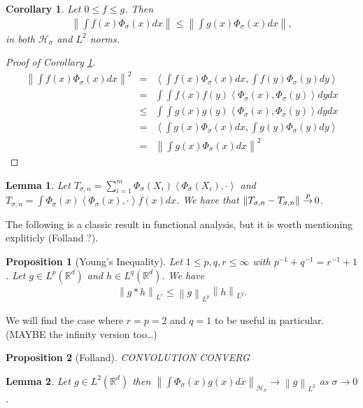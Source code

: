 \documentclass{article} %
\def\hsig{{\mathcal{H}_\sigma}}
\def\fm{{\Phi_\sigma}} %
\def\cip{\,{\buildrel p \over \rightarrow}\,}
\def\rn{\mathbb{R}}
\def\l{\left}
\def\r{\right}
\newtheorem{lem}{Lemma}
\newtheorem{cor}{Corollary}
\newtheorem{prop}{Proposition}
\theoremstyle{definition}
\begin{document}
\begin{cor}\label{cor:hilbbigger}
	Let $0\le f\le g$. Then
	\begin{eqnarray*}
		\l\|\int f(x) \fm(x) dx\r\| \le \l\|\int g(x) \fm(x)dx\r\|,
	\end{eqnarray*}
	in both $\hsig$ and $L^2$ norms.
\end{cor}
\begin{proof}[Proof of Corollary \ref{cor:hilbbigger}]
	\begin{eqnarray*}
		\l\|\int f(x) \fm(x) dx\r\|^2
		&=& \l<\int f(x) \fm\left( x \right) dx , \int f(y) \fm \left( y \right) dy \r>\\
		       &=& \int \int f(x) f(y)\l< \fm\left( x \right)  ,  \fm \left( y \right)  \r>dydx\\
			      &\le& \int \int g(x) g(y)\l< \fm\left( x \right)  ,  \fm \left( y \right)  \r>dydx\\
			      &=& \l<\int g(x) \fm\left( x \right) dx , \int g(y) \fm \left( y \right) dy \r>\\
			      &=& \l\|\int g(x) \fm(x) dx\r\|^2
	\end{eqnarray*}
\end{proof}
\begin{lem}
	Let $T_{\sigma,n} = \sum_{i=1}^m \fm\left( X_i \right)\l<\fm\left( X_i \right),\cdot\r>$ and $T_{\sigma,n} = \int \fm(x)\l<\fm(x),\cdot\r> f(x) dx$. We have that $\l\|T_{\sigma,n} - T_{\sigma,n}\r\| \cip 0$.
\end{lem}


The following is a classic result in functional analysis, but it is worth mentioning expliticly (Folland ?).
\begin{prop}[Young's Inequality]\label{prop:young}
	Let $1\le p,q,r \le \infty$ with $p^{-1} + q^{-1} = r^{-1} +1$. Let $g \in L^p\left( \rn^d \right)$ and $h \in L^q\left( \rn^d \right)$. We have
	\begin{eqnarray*}
		\l\|g\ast h \r\|_{L^r} \le \l\|g\r\|_{L^p} \l\|h\r\|_{L^q}.
	\end{eqnarray*}
\end{prop}
We will find the case where $r=p=2$ and $q=1$ to be useful in particular. (MAYBE the infinity version too\dots)

\begin{prop}[Folland]\label{prop:convcvg}
	CONVOLUTION CONVERG
\end{prop}

\begin{lem}\label{lem:hsigl2normcvg}
	Let $g\in L^2\l(\rn^d\r)$ then $\l\|\int \fm(x) g(x) dx \r\|_\hsig \to \l\|g\r\|_{L^2}$ as $\sigma \to 0$.
\end{lem}
\end{document}
